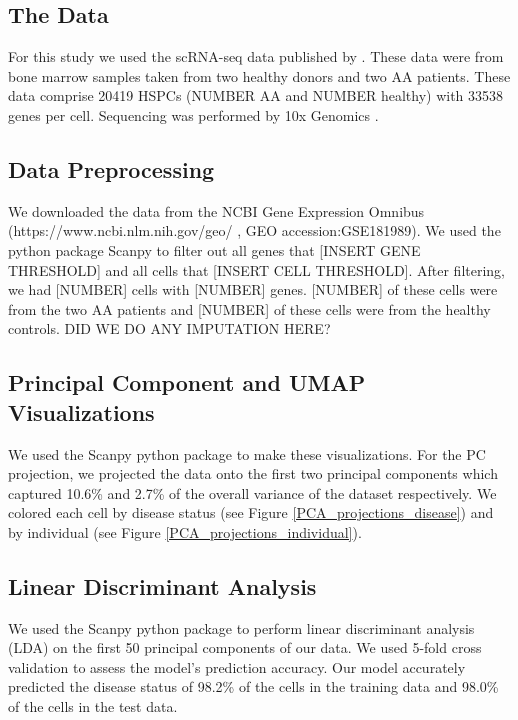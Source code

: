 \documentclass{article}
\begin{document}
\subsection{The Data}
For this study we used the scRNA-seq data published by \citet{tonglin_single-cell_2022}.
These data were from bone marrow samples taken from two healthy donors and two AA patients.
These data comprise 20419 HSPCs (NUMBER AA and NUMBER healthy) with 33538 genes per cell.
Sequencing was performed by 10x Genomics \citep{10X_genomics}.

\subsection{Data Preprocessing}
We downloaded the data from the NCBI Gene Expression Omnibus (https://www.ncbi.nlm.nih.gov/geo/ , GEO accession:GSE181989).
We used the python package Scanpy \citep{wolf_scanpy_2018} to filter out all genes that [INSERT GENE THRESHOLD] and all cells that [INSERT CELL THRESHOLD].
After filtering, we had [NUMBER] cells with [NUMBER] genes.
[NUMBER] of these cells were from the two AA patients and [NUMBER] of these cells were from the healthy controls.
DID WE DO ANY IMPUTATION HERE?

\subsection{Principal Component and UMAP Visualizations}
We used the Scanpy python package \citep{wolf_scanpy_2018} to make these visualizations.
For the PC projection, we projected the data onto the first two principal components which captured 10.6\% and 2.7\% of the overall variance of the dataset respectively.
We colored each cell by disease status (see Figure \ref{PCA_projections_disease}) and by individual (see Figure \ref{PCA_projections_individual}).

\subsection{Linear Discriminant Analysis}
We used the Scanpy python package \citep{wolf_scanpy_2018} to perform linear discriminant analysis (LDA) on the first 50 principal components of our data.
We used 5-fold cross validation to assess the model's prediction accuracy.
Our model accurately predicted the disease status of 98.2\% of the cells in the training data and 98.0\% of the cells in the test data.
\end{document}
